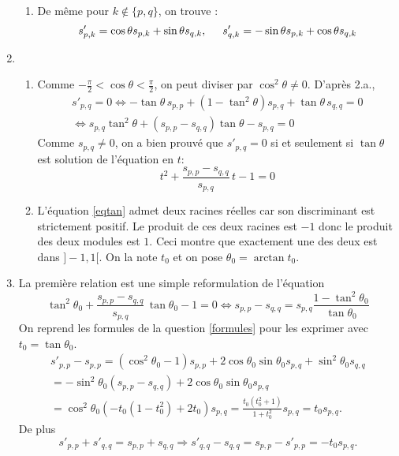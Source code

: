 \begin{enumerate}
\begin{enumerate}
 \item De même pour $k\notin \{ p,q \}$, on trouve :
\begin{equation} \label{Sprimepqk}
 s'_{p,k} = \cos \theta s_{p,k} + \sin \theta s_{q,k}, \hspace{0.5cm}
 s'_{q,k} = -\sin \theta s_{p,k} + \cos \theta s_{q,k}
\end{equation}

\end{enumerate}

 \item 
\begin{enumerate}
 \item Comme $-\frac{\pi}{2} < \cos \theta < \frac{\pi}{2}$, on peut diviser par $\cos^2\theta \neq 0$. D'après 2.a.,
\begin{multline*}
 s'_{p,q} = 0 \Leftrightarrow 
-\tan \theta \,s_{p,p} + (1-\tan^2 \theta)s_{p,q} + \tan \theta\,s_{q,q} = 0 \\
\Leftrightarrow s_{p,q} \tan^2 \theta +(s_{p,p} - s_{q,q})\tan \theta -s_{p,q} = 0
\end{multline*}
Comme $s_{p,q}\neq 0$, on a bien prouvé que $s'_{p,q}=0$ si et seulement si $\tan \theta$ est solution de l'équation en $t$:
\begin{equation}
 t^2 + \frac{s_{p,p}-s_{q,q}}{s_{p,q}}\,t -1 = 0 \label{eqtan}
\end{equation} 

 \item  L'équation \ref{eqtan} admet deux racines réelles car son discriminant est strictement positif. Le produit de ces deux racines est $-1$ donc le produit des deux modules est $1$. Ceci montre que exactement une des deux est dans $]-1, 1[$. On la note $t_0$ et on pose $\theta_0 = \arctan t_0$.
\end{enumerate}

 \item La première relation est une simple reformulation de l'équation 
\begin{displaymath}
 \tan^2\theta_0 + \frac{s_{p,p}-s_{q,q}}{s_{p,q}}\,\tan \theta_0 -1 = 0
\Leftrightarrow
s_{p,p} - s_{q,q} = s_{p,q} \frac{1-\tan^2\theta_0}{\tan \theta_0}
\end{displaymath}
 On reprend les formules de la question \ref{formules} pour les exprimer avec $t_0 = \tan \theta_0$.
\begin{multline*}
s'_{p,p} - s_{p,p} = (\cos^2\theta_0 -1)s_{p,p} + 2\cos\theta_0\sin\theta_0 s_{p,q} + \sin^2\theta_0 s_{q,q} \\
= -\sin^2\theta_0\left( s_{p,p}-s_{q,q}\right) + 2\cos\theta_0\sin\theta_0 s_{p,q} \\
= \cos^2 \theta_0\left( -t_0(1-t_0^2) + 2t_0\right) s_{p,q} 
= \frac{t_0(t_0^2 + 1)}{1+t_0^2}s_{p,q} = t_0 s_{p,q}.
\end{multline*}
De plus
\begin{displaymath}
s'_{p,p} + s'_{q,q} = s_{p,p} + s_{q,q} 
\Rightarrow 
s'_{q,q} - s_{q,q} = s_{p,p} - s'_{p,p} = -t_0 s_{p,q}. 
\end{displaymath}
 

\end{enumerate}
